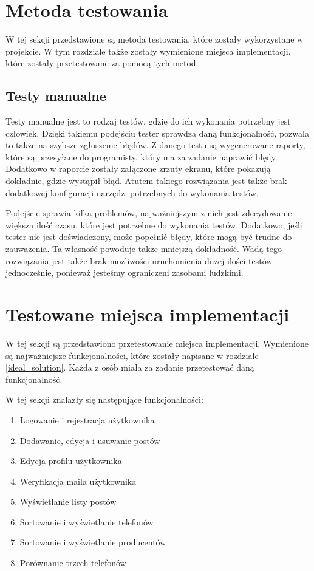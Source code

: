 \section{Metoda testowania}
W tej sekcji przedstawione są metoda testowania, które zostały wykorzystane w projekcie. W tym rozdziale także zostały wymienione miejsca implementacji, które zostały przetestowane za pomocą tych metod. 

\subsection{Testy manualne}
Testy manualne jest to rodzaj testów, gdzie do ich wykonania potrzebny jest człowiek. Dzięki takiemu podejściu tester sprawdza daną funkcjonalność, pozwala to także na szybsze zgłoszenie błędów. Z danego testu są wygenerowane raporty, które są przesyłane do programisty, który ma za zadanie naprawić błędy. Dodatkowo w raporcie zostały załączone zrzuty ekranu, które pokazują dokładnie, gdzie wystąpił błąd. Atutem takiego rozwiązania jest także brak dodatkowej konfiguracji narzędzi potrzebnych do wykonania testów.

Podejście sprawia kilka problemów, najważniejszym z nich jest zdecydowanie większa ilość czasu, które jest potrzebne do wykonania testów. Dodatkowo, jeśli tester nie jest doświadczony, może popełnić błędy, które mogą być trudne do zauważenia. Ta własność powoduje także mniejszą dokładność. Wadą tego rozwiązania jest także brak możliwości uruchomienia dużej ilości testów jednocześnie, ponieważ jesteśmy ograniczeni zasobami ludzkimi. 

\section{Testowane miejsca implementacji}
W tej sekcji są przedstawiono przetestowanie miejsca implementacji. Wymienione są najważniejsze funkcjonalności, które zostały napisane w rozdziale \ref{ideal_solution}. Każda z osób miała za zadanie przetestować daną funkcjonalność.

W tej sekcji znalazły się następujące funkcjonalności:
\begin{enumerate}
  \item Logowanie i rejestracja użytkownika
  \item Dodawanie, edycja i usuwanie postów
  \item Edycja profilu użytkownika
  \item Weryfikacja maila użytkownika
  \item Wyświetlanie listy postów
  \item Sortowanie i wyświetlanie telefonów
  \item Sortowanie i wyświetlanie producentów
  \item Porównanie trzech telefonów
\end{enumerate}

